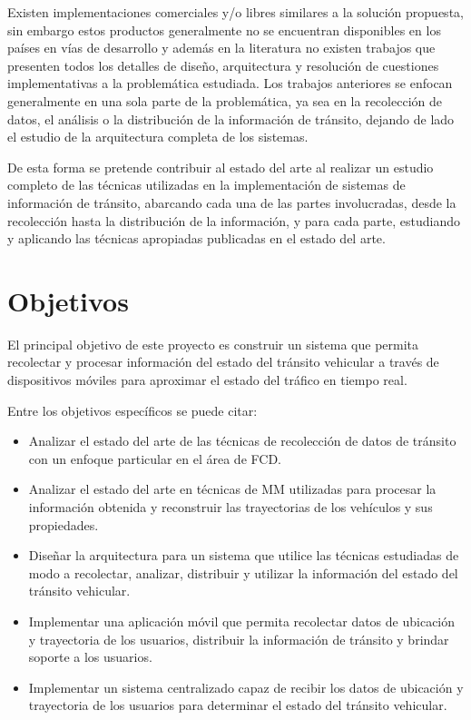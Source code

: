 Existen implementaciones comerciales y/o libres similares a la solución propuesta, sin embargo estos productos generalmente no se encuentran disponibles en los países en vías de desarrollo y además en la literatura no existen trabajos que presenten todos los detalles de diseño, arquitectura y resolución de cuestiones implementativas a la problemática estudiada. Los trabajos anteriores se enfocan generalmente en una sola parte de la problemática, ya sea en la recolección de datos, el análisis o la distribución de la información de tránsito, dejando de lado el estudio de la arquitectura completa de los sistemas.

De esta forma se pretende contribuir al estado del arte al realizar un estudio completo de las técnicas utilizadas en la implementación de sistemas de información de tránsito, abarcando cada una de las partes involucradas, desde la recolección hasta la distribución de la información, y para cada parte, estudiando y aplicando las técnicas apropiadas publicadas en el estado del arte.

\section{Objetivos}

El principal objetivo de este proyecto es construir un sistema que permita recolectar y procesar información del estado del tránsito vehicular a través de dispositivos móviles para aproximar el estado del tráfico en tiempo real.

Entre los objetivos específicos se puede citar:

\begin{itemize}

\item Analizar el estado del arte de las técnicas de recolección de datos de tránsito con un enfoque particular en el área de FCD.

\item Analizar el estado del arte en técnicas de MM utilizadas para procesar la información obtenida y reconstruir las trayectorias de los vehículos y sus propiedades.

\item Diseñar la arquitectura para un sistema que utilice las técnicas estudiadas de modo a recolectar, analizar, distribuir y utilizar la información del estado del tránsito vehicular.

\item Implementar una aplicación móvil que permita recolectar datos de ubicación y trayectoria de los usuarios, distribuir la información de tránsito y brindar soporte a los usuarios.

\item Implementar un sistema centralizado capaz de recibir los datos de ubicación y trayectoria de los usuarios para determinar el estado del tránsito vehicular.

\end{itemize}

